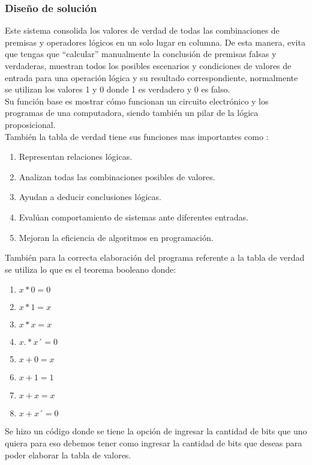 \subsubsection {Diseño de solución}

Este sistema consolida los valores de verdad de todas las combinaciones de premisas y operadores lógicos en un solo lugar en columna. De esta manera, evita que tengas que “calcular” manualmente la conclusión de premisas falsas y verdaderas, muestran todos los posibles escenarios y condiciones de valores de entrada para una operación lógica y su resultado correspondiente, normalmente se utilizan los valores 1 y 0 donde 1 es verdadero y 0 es falso. 
\\
Su función base es mostrar cómo funcionan un circuito electrónico y los programas de una computadora, siendo también un pilar de la lógica proposicional.\\
También la tabla de verdad tiene sus funciones mas importantes como :
\begin{enumerate}
 \item Representan relaciones lógicas.
 \item Analizan todas las combinaciones posibles de valores.
 \item Ayudan a deducir conclusiones lógicas.
 \item Evalúan comportamiento de sistemas ante diferentes entradas.
 \item Mejoran la eficiencia de algoritmos en programación.
\end{enumerate}
También para la correcta elaboración del programa referente a la tabla de verdad se utiliza lo que es el teorema booleano donde: 
\begin{enumerate}
    \item $x * 0 = 0 $
    \item $x * 1 = x$
    \item $x * x = x $
    \item $x .* x´= 0$
    \item $x + 0 = x$
    \item $x + 1 = 1$
    \item $x + x = x$
    \item $x + x´= 0$
\end{enumerate}

Se hizo un código donde se tiene la opción de ingresar la cantidad de bits que uno quiera para eso debemos tener como ingresar la cantidad de bits que deseas para poder elaborar la tabla de valores.
